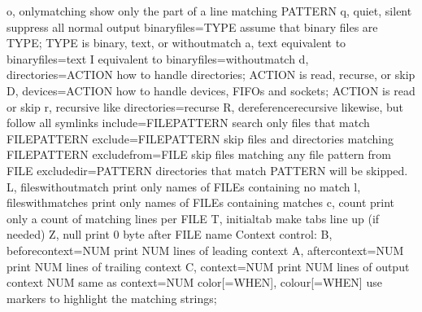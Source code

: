 \documentclass[letterpaper,12pt,english]{sphinxmanual}
\begin{document}
\begin{sphinxVerbatim}[commandchars=\\\{\}]
  \PYGZhy{}o, \PYGZhy{}\PYGZhy{}only\PYGZhy{}matching       show only the part of a line matching PATTERN
  \PYGZhy{}q, \PYGZhy{}\PYGZhy{}quiet, \PYGZhy{}\PYGZhy{}silent     suppress all normal output
      \PYGZhy{}\PYGZhy{}binary\PYGZhy{}files=TYPE   assume that binary files are TYPE;
                            TYPE is \PYGZsq{}binary\PYGZsq{}, \PYGZsq{}text\PYGZsq{}, or \PYGZsq{}without\PYGZhy{}match\PYGZsq{}
  \PYGZhy{}a, \PYGZhy{}\PYGZhy{}text                equivalent to \PYGZhy{}\PYGZhy{}binary\PYGZhy{}files=text
  \PYGZhy{}I                        equivalent to \PYGZhy{}\PYGZhy{}binary\PYGZhy{}files=without\PYGZhy{}match
  \PYGZhy{}d, \PYGZhy{}\PYGZhy{}directories=ACTION  how to handle directories;
                            ACTION is \PYGZsq{}read\PYGZsq{}, \PYGZsq{}recurse\PYGZsq{}, or \PYGZsq{}skip\PYGZsq{}
  \PYGZhy{}D, \PYGZhy{}\PYGZhy{}devices=ACTION      how to handle devices, FIFOs and sockets;
                            ACTION is \PYGZsq{}read\PYGZsq{} or \PYGZsq{}skip\PYGZsq{}
  \PYGZhy{}r, \PYGZhy{}\PYGZhy{}recursive           like \PYGZhy{}\PYGZhy{}directories=recurse
  \PYGZhy{}R, \PYGZhy{}\PYGZhy{}dereference\PYGZhy{}recursive  likewise, but follow all symlinks
      \PYGZhy{}\PYGZhy{}include=FILE\PYGZus{}PATTERN  search only files that match FILE\PYGZus{}PATTERN
      \PYGZhy{}\PYGZhy{}exclude=FILE\PYGZus{}PATTERN  skip files and directories matching    FILE\PYGZus{}PATTERN
      \PYGZhy{}\PYGZhy{}exclude\PYGZhy{}from=FILE   skip files matching any file pattern from    FILE
      \PYGZhy{}\PYGZhy{}exclude\PYGZhy{}dir=PATTERN  directories that match PATTERN will be    skipped.
  \PYGZhy{}L, \PYGZhy{}\PYGZhy{}files\PYGZhy{}without\PYGZhy{}match  print only names of FILEs containing no    match
  \PYGZhy{}l, \PYGZhy{}\PYGZhy{}files\PYGZhy{}with\PYGZhy{}matches  print only names of FILEs containing matches
  \PYGZhy{}c, \PYGZhy{}\PYGZhy{}count               print only a count of matching lines per FILE
  \PYGZhy{}T, \PYGZhy{}\PYGZhy{}initial\PYGZhy{}tab         make tabs line up (if needed)
  \PYGZhy{}Z, \PYGZhy{}\PYGZhy{}null                print 0 byte after FILE name
Context control:
  \PYGZhy{}B, \PYGZhy{}\PYGZhy{}before\PYGZhy{}context=NUM  print NUM lines of leading context
  \PYGZhy{}A, \PYGZhy{}\PYGZhy{}after\PYGZhy{}context=NUM   print NUM lines of trailing context
  \PYGZhy{}C, \PYGZhy{}\PYGZhy{}context=NUM         print NUM lines of output context
  \PYGZhy{}NUM                      same as \PYGZhy{}\PYGZhy{}context=NUM
      \PYGZhy{}\PYGZhy{}color[=WHEN],
      \PYGZhy{}\PYGZhy{}colour[=WHEN]       use markers to highlight the matching    strings;

\end{sphinxVerbatim}
\end{document}
